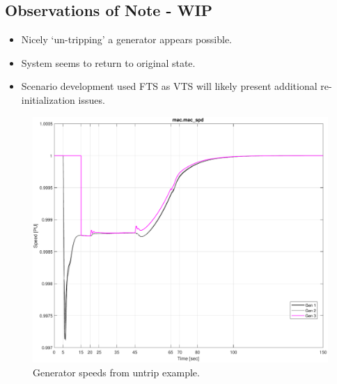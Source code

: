 \subsection{Observations of Note - WIP}
\begin{itemize}
 em
\singlespacing
\item Nicely `un-tripping' a generator appears possible.
\item System seems to return to original state.
\item Scenario development used FTS as VTS will likely present additional re-initialization issues.
\end{itemize}

\begin{figure}[H]
	\centering
	\footnotesize
	\includegraphics[width=\linewidth]{examples/untrip/combinedSpeed}
	\caption{Generator speeds from untrip example.}
	\label{fig: untrip 2}
\end{figure}%

